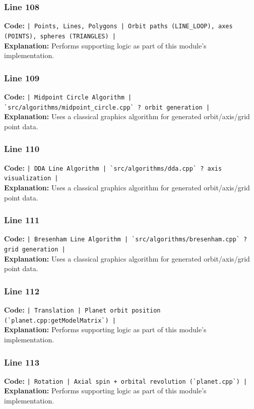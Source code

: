 \documentclass[11pt,a4paper]{article}
\begin{document}
\subsubsection*{Line 108}
\textbf{Code:} \verb!| Points, Lines, Polygons | Orbit paths (LINE_LOOP), axes (POINTS), spheres (TRIANGLES) |!\\
\textbf{Explanation:} Performs supporting logic as part of this module's implementation.

\subsubsection*{Line 109}
\textbf{Code:} \verb!| Midpoint Circle Algorithm | `src/algorithms/midpoint_circle.cpp` ? orbit generation |!\\
\textbf{Explanation:} Uses a classical graphics algorithm for generated orbit/axis/grid point data.

\subsubsection*{Line 110}
\textbf{Code:} \verb!| DDA Line Algorithm | `src/algorithms/dda.cpp` ? axis visualization |!\\
\textbf{Explanation:} Uses a classical graphics algorithm for generated orbit/axis/grid point data.

\subsubsection*{Line 111}
\textbf{Code:} \verb!| Bresenham Line Algorithm | `src/algorithms/bresenham.cpp` ? grid generation |!\\
\textbf{Explanation:} Uses a classical graphics algorithm for generated orbit/axis/grid point data.

\subsubsection*{Line 112}
\textbf{Code:} \verb!| Translation | Planet orbit position (`planet.cpp:getModelMatrix`) |!\\
\textbf{Explanation:} Performs supporting logic as part of this module's implementation.

\subsubsection*{Line 113}
\textbf{Code:} \verb!| Rotation | Axial spin + orbital revolution (`planet.cpp`) |!\\
\textbf{Explanation:} Performs supporting logic as part of this module's implementation.
\end{document}
